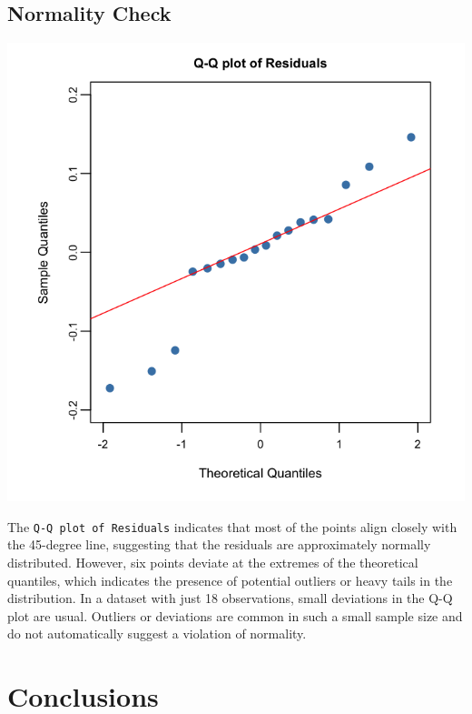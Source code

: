 \documentclass[
  11pt,
]{article}
\begin{document}
\subsection{Normality Check}\label{normality-check}

\begin{minipage}{0.35\textwidth}
\centering
\includegraphics[width=1\linewidth]{qqplot_residuals.png}
\end{minipage}
\hfill
\begin{minipage}{0.6\textwidth}
\small
The \texttt{Q-Q plot of Residuals} indicates that most of the points align closely with the 45-degree line, suggesting that the residuals are approximately normally distributed. However, six points deviate at the extremes of the theoretical quantiles, which indicates the presence of potential outliers or heavy tails in the distribution. In a dataset with just 18 observations, small deviations in the Q-Q plot are usual. Outliers or deviations are common in such a small sample size and do not automatically suggest a violation of normality.
\end{minipage}

\section{Conclusions}\label{conclusions}
\end{document}
